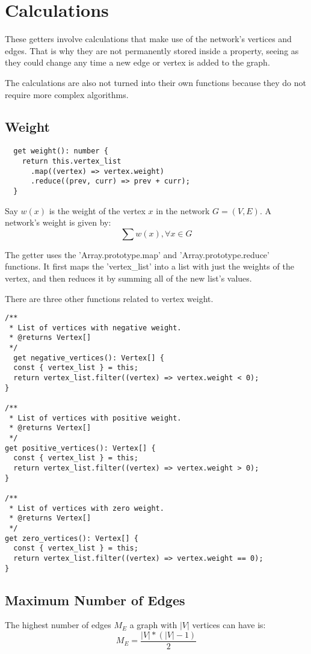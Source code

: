 \section{Calculations}

These getters involve calculations that make use of the network's vertices and edges. That is why they are not permanently stored inside a property, seeing as they could change any time a new edge or vertex is added to the graph.

The calculations are also not turned into their own functions because they do not require more complex algorithms.

\subsection{Weight}

\begin{verbatim}
  get weight(): number {
    return this.vertex_list
      .map((vertex) => vertex.weight)
      .reduce((prev, curr) => prev + curr);
  }
\end{verbatim}

Say $w(x)$ is the weight of the vertex $x$ in the network $G=(V,E)$. A network's weight is given by:
$$\sum{w(x)}, \forall x \in G$$

The getter uses the 'Array.prototype.map' and 'Array.prototype.reduce' functions.
It first maps the 'vertex\_list' into a list with just the weights of the vertex, and then reduces it by summing all of the new list's values.

There are three other functions related to vertex weight.

\begin{verbatim}
/**
 * List of vertices with negative weight.
 * @returns Vertex[]
 */
  get negative_vertices(): Vertex[] {
  const { vertex_list } = this;
  return vertex_list.filter((vertex) => vertex.weight < 0);
}

/**
 * List of vertices with positive weight.
 * @returns Vertex[]
 */
get positive_vertices(): Vertex[] {
  const { vertex_list } = this;
  return vertex_list.filter((vertex) => vertex.weight > 0);
}

/**
 * List of vertices with zero weight.
 * @returns Vertex[]
 */
get zero_vertices(): Vertex[] {
  const { vertex_list } = this;
  return vertex_list.filter((vertex) => vertex.weight == 0);
}
\end{verbatim}

\subsection{Maximum Number of Edges}
The highest number of edges $M_E$ a graph with $|V|$ vertices can have is:
$$M_E=\frac{|V|*(|V|-1)}{2}$$

